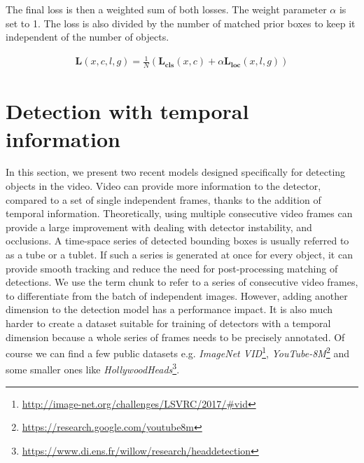 \noindent The final loss is then a weighted sum of both losses. The weight parameter $\alpha$ is set to 1. The loss is also divided by the number of matched prior boxes to keep it independent of the number of objects.

\begin{align*}
\mathbf{L}(x,c,l,g) = \frac{1}{N}(\mathbf{L_{\text{cls}}}(x,c) + \alpha\mathbf{L_{\text{loc}}}(x,l,g))
\end{align*}






\section{Detection with temporal information}
In this section, we present two recent models designed specifically for detecting objects in the video. Video can provide more information to the detector, compared to a set of single independent frames, thanks to the addition of temporal information. Theoretically, using multiple consecutive video frames can provide a large improvement with dealing with detector instability, and occlusions. 
A time-space series of detected bounding boxes is usually referred to as a tube or a tublet. If such a series is generated at once for every object, it can provide smooth tracking and reduce the need for post-processing matching of detections. We use the term chunk to refer to a series of consecutive video frames, to differentiate from the batch of independent images.
However, adding another dimension to the detection model has a performance impact. It is also much harder to create a dataset suitable for training of detectors with a temporal dimension because a whole series of frames needs to be precisely annotated. Of course we can find a few public datasets e.g. \textit{ImageNet VID}\footnote{\url{http://image-net.org/challenges/LSVRC/2017/\#vid}}, \textit{YouTube-8M}\footnote{\url{https://research.google.com/youtube8m}} and some smaller ones like \textit{HollywoodHeads}\footnote{\url{https://www.di.ens.fr/willow/research/headdetection}}.



